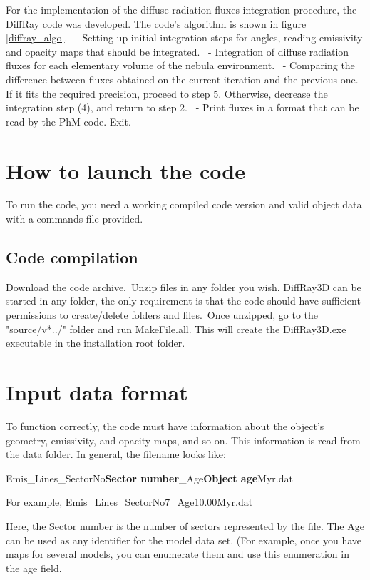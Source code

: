 \documentclass[a4paper]{article}
\begin{document}
For the implementation of the diffuse radiation fluxes integration procedure, the DiffRay code was developed. The code's algorithm is shown in figure \ref{diffray_algo}.\
 - Setting up initial integration steps for angles, reading emissivity and opacity maps that should be integrated.\
 - Integration of diffuse radiation fluxes for each elementary volume of the nebula environment.\
 - Comparing the difference between fluxes obtained on the current iteration and the previous one. If it fits the required precision, proceed to step 5. Otherwise, decrease the integration step (4), and return to step 2.\
 - Print fluxes in a format that can be read by the PhM code. Exit.\

\section{How to launch the code}

To run the code, you need a working compiled code version and valid object data with a commands file provided.

\subsection{Code compilation}

Download the code archive.\
Unzip files in any folder you wish. DiffRay3D can be started in any folder, the only requirement is that the code should have sufficient permissions to create/delete folders and files.\
Once unzipped, go to the "source/v*../" folder and run MakeFile.all. This will create the DiffRay3D.exe executable in the installation root folder.\
\section{Input data format}
To function correctly, the code must have information about the object's geometry, emissivity, and opacity maps, and so on. This information is read from the data folder. In general, the filename looks like:

Emis\_Lines\_SectorNo{\bf Sector number}\_Age{\bf Object age}Myr.dat

For example, Emis_Lines_SectorNo7_Age10.00Myr.dat

Here, the Sector number is the number of sectors represented by the file. The Age can be used as any identifier for the model data set. (For example, once you have maps for several models, you can enumerate them and use this enumeration in the age field.
\end{document}

